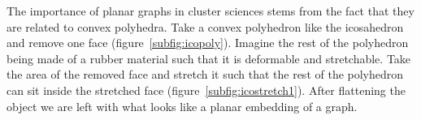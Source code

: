 The importance of planar graphs in cluster sciences stems from the fact that
they are related to convex polyhedra. Take a convex polyhedron like the
icosahedron and remove one face (figure~\ref{subfig:icopoly}). Imagine the rest
of the polyhedron being made of a rubber material such that it is deformable
and stretchable. Take the area of the removed face and stretch it such that the
rest of the polyhedron can sit inside the stretched face
(figure~\ref{subfig:icostretch1}). After flattening the object we are left with
what looks like a planar embedding of a graph.
%
\begin{figure}[htb]
    \centering
    \def \ico {1.618}
    \subfloat[\label{subfig:icopoly}]{
    \begin{tikzpicture}[tdplot_main_coords,
        every node/.style = {circle, fill = blue!20, inner sep = 0pt, minimum size = 0.5cm},
        rotate = 0,
        line join=bevel]


        \coordinate (1) at (0, 1, \ico);
        \coordinate (2) at (0, 1, -\ico);
        \coordinate (3) at (0, -1, \ico);
        \coordinate (4) at (0, -1, -\ico);
        \coordinate (5) at (1, \ico, 0);
        \coordinate (6) at (1, -\ico, 0);
        \coordinate (7) at (-1, \ico, 0);
        \coordinate (8) at (-1, -\ico, 0);
        \coordinate (9) at (\ico, 0, 1);
        \coordinate (10) at (\ico, 0, -1);
        \coordinate (11) at (-\ico, 0, 1);
        \coordinate (12) at (-\ico, 0, -1);

        


\end{tikzpicture}}
\end{figure}
